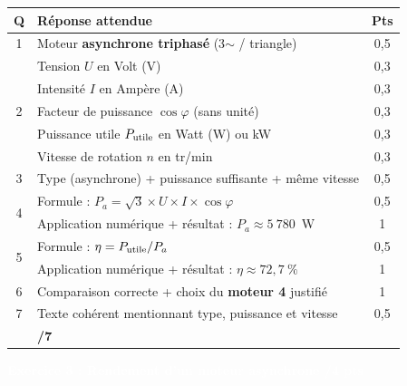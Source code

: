 \documentclass[10pt,a4paper]{article}
\newcommand{\exotitle}[2]{%
  \noindent\colorbox{exoheader}{%
    \parbox{\dimexpr\linewidth-2\fboxsep\relax}{%
      \textcolor{white}{\textbf{\large #1 \hfill #2}}%
    }%
  }%
}
\begin{document}
\begin{tabularx}{\linewidth}{|c|X|c|}
  \hline
  \rowcolor{exolight}
  \textbf{Q} & \textbf{Réponse attendue} & \textbf{Pts} \\
  \hline
  1 & Moteur \textbf{asynchrone triphasé} (3$\sim$ / triangle) & 0,5 \\
  \hline
  \multirow{5}{*}{2} & Tension $U$ en Volt (V) & 0,3 \\
  \cline{2-3}
  & Intensité $I$ en Ampère (A) & 0,3 \\
  \cline{2-3}
  & Facteur de puissance $\cos\varphi$ (sans unité) & 0,3 \\
  \cline{2-3}
  & Puissance utile $P_{\rm utile}$ en Watt (W) ou kW & 0,3 \\
  \cline{2-3}
  & Vitesse de rotation $n$ en tr/min & 0,3 \\
  \hline
  3 & Type (asynchrone) + puissance suffisante + même vitesse & 0,5 \\
  \hline
  \multirow{2}{*}{4} & Formule : $P_a = \sqrt{3} \times U \times I \times \cos\varphi$ & 0,5 \\
  \cline{2-3}
  & Application numérique + résultat : $P_a \approx 5~780$~W & 1 \\
  \hline
  \multirow{2}{*}{5} & Formule : $\eta = P_{\rm utile} / P_a$ & 0,5 \\
  \cline{2-3}
  & Application numérique + résultat : $\eta \approx 72{,}7~\%$ & 1 \\
  \hline
  6 & Comparaison correcte + choix du \textbf{moteur 4} justifié & 1 \\
  \hline
  7 & Texte cohérent mentionnant type, puissance et vitesse & 0,5 \\
  \hline
  \rowcolor{totalrow}
  \multicolumn{2}{|r|}{\textbf{Sous-total Exercice 2}} & \textbf{/7} \\
  \hline
\end{tabularx}

\vspace{3mm}

\exotitle{Exercice 3 : Rendement d'un moteur asynchrone}{/4 pts}

\vspace{1mm}
\end{document}
